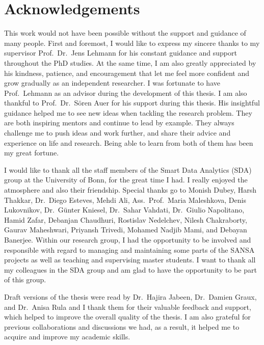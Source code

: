 \chapter*{Acknowledgements}
\label{sec:ack}
This work would not have been possible without the support and guidance of many people.
First and foremost, I would like to express my sincere thanks to my supervisor Prof.\ Dr.\ Jens Lehmann for his constant guidance and support throughout the PhD studies.
At the same time, I am also greatly appreciated by his kindness, patience, and encouragement that let me feel more confident and grow gradually as an independent researcher.
I was fortunate to have Prof.\ Lehmann as an advisor during the development of this thesis.
I am also thankful to Prof.\ Dr.\ S{\"o}ren Auer for his support during this thesis.
His insightful guidance helped me to see new ideas when tackling the research problem.
They are both inspiring mentors and continue to lead by example. 
They always challenge me to push ideas and work further, and share their advice and experience on life and research. 
Being able to learn from both of them has been my great fortune.

I would like to thank all the staff members of the Smart Data Analytics (SDA) group at the University of Bonn, for the great time I had.
I really enjoyed the atmosphere and also their friendship.
Special thanks go to Monish Dubey, Harsh Thakkar, Dr.\ Diego Esteves, Mehdi Ali, Ass.\ Prof.\ Maria Maleshkova, Denis Lukovnikov, Dr.\ G{\"{u}}nter Kniesel, Dr.\ Sahar Vahdati, Dr.\ Giulio Napolitano, Hamid Zafar, Debanjan Chaudhuri, Rostislav Nedelchev, Nilesh Chakraborty, Gaurav Maheshwari, Priyansh Trivedi, Mohamed Nadjib Mami, and Debayan Banerjee.
Within our research group, I had the opportunity to be involved and responsible with regard to managing and maintaining some parts of the SANSA projects as well as teaching and supervising master students.
I want to thank all my colleagues in the SDA group and am glad to have the opportunity to be part of this group.

Draft versions of the thesis were read by Dr.\ Hajira Jabeen, Dr.\ Damien Graux, and Dr.\ Anisa Rula and I thank them for their valuable feedback and support, which helped to improve the overall quality of the thesis.
I am also grateful for previous collaborations and discussions we had, as a result, it helped me to acquire and improve my academic skills.

